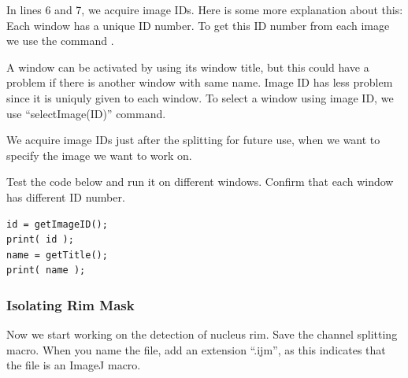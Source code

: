In lines 6 and 7, we acquire image IDs. Here is some more explanation about this: Each window has a unique ID number. To get this ID number from each image we use the command .

\begin{indentCom}
\end{indentCom}

A window can be activated by  using its window title, but this could have a problem if there is another window with same name. Image ID has less problem since it is uniquly given to each window. To select a window using image ID, we use ``selectImage(ID)'' command.

\begin{indentCom}

\end{indentCom}

We acquire image IDs just after the splitting for future use, when we want to specify the image we want to work on. 

\begin{indentexercise}{1}
Test the code below and run it on different windows. Confirm that each window has different ID number. 
\begin{lstlisting}
id = getImageID();
print( id );
name = getTitle();
print( name );
\end{lstlisting}
\end{indentexercise}


\subsubsection{Isolating Rim Mask}

Now we start working on the detection of nucleus rim. Save the channel splitting macro. When you name the file, add an extension ``.ijm'', as this indicates that the file is an ImageJ macro. 

